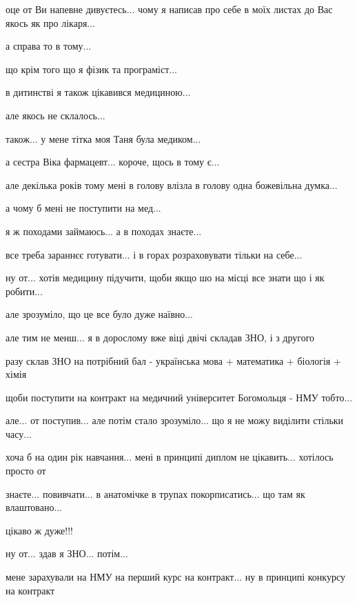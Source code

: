  
 
 
 
 


оце от Ви напевне дивуєтесь... чому я написав про себе в моїх листах до Вас якось як про лікаря...

а справа то в тому...

що крім того що я фізик та програміст...

в дитинстві я також цікавився медициною...

але якось не склалось...

також... у мене тітка моя Таня була медиком...

а сестра Віка фармацевт... короче, щось в тому є...

але декілька років тому мені в голову влізла в голову одна божевільна думка...

а чому б мені не поступити на мед...

я ж походами займаюсь... а в походах знаєте...

все треба зараннєє готувати... і в горах розраховувати тільки на себе...

ну от... хотів медицину підучити, щоби якщо шо на місці все знати що і як робити...

але зрозуміло, що це все було дуже наївно...

але тим не менш... я в дорослому вже віці двічі складав ЗНО, і з другого

разу склав ЗНО на потрібний бал - українська мова + математика + біологія + хімія

щоби поступити на контракт на медичний університет Богомольця - НМУ тобто...

але... от поступив... але потім стало зрозуміло... що я не можу виділити стільки часу...

хоча б на один рік навчання... мені в принципі диплом не цікавить... хотілось просто от

знаєте... повивчати... в анатомічке в трупах покорписатись... що там як влаштовано...

цікаво ж дуже!!!

ну от... здав я ЗНО... потім...

мене зарахували на НМУ на перший курс на контракт... ну в принципі конкурсу на контракт

